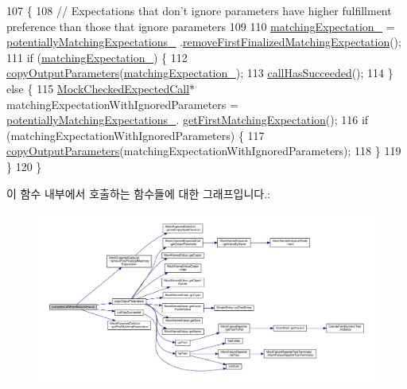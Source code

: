 \begin{DoxyCode}
107 \{
108     \textcolor{comment}{// Expectations that don't ignore parameters have higher fulfillment preference than those that ignore
       parameters}
109 
110     \hyperlink{class_mock_checked_actual_call_aca733859eb143b7a7bf611a39d94d6f6}{matchingExpectation\_} = \hyperlink{class_mock_checked_actual_call_a4fc6bec7509ed6eb28096956758c030a}{potentiallyMatchingExpectations\_}
      .\hyperlink{class_mock_expected_calls_list_a1a73fba9891c64207b06fb3f83fdad75}{removeFirstFinalizedMatchingExpectation}();
111     \textcolor{keywordflow}{if} (\hyperlink{class_mock_checked_actual_call_aca733859eb143b7a7bf611a39d94d6f6}{matchingExpectation\_}) \{
112         \hyperlink{class_mock_checked_actual_call_a36356ef39dd2664152f94d6843c45365}{copyOutputParameters}(\hyperlink{class_mock_checked_actual_call_aca733859eb143b7a7bf611a39d94d6f6}{matchingExpectation\_});
113         \hyperlink{class_mock_checked_actual_call_ae81fb048e3c671dcea98e758ce893af5}{callHasSucceeded}();
114     \} \textcolor{keywordflow}{else} \{
115         \hyperlink{class_mock_checked_expected_call}{MockCheckedExpectedCall}* matchingExpectationWithIgnoredParameters = 
      \hyperlink{class_mock_checked_actual_call_a4fc6bec7509ed6eb28096956758c030a}{potentiallyMatchingExpectations\_}.
      \hyperlink{class_mock_expected_calls_list_ab6c35f9ece49ce41eae2d46ed7b94a1d}{getFirstMatchingExpectation}();
116         \textcolor{keywordflow}{if} (matchingExpectationWithIgnoredParameters) \{
117             \hyperlink{class_mock_checked_actual_call_a36356ef39dd2664152f94d6843c45365}{copyOutputParameters}(matchingExpectationWithIgnoredParameters);
118         \}
119     \}
120 \}
\end{DoxyCode}


이 함수 내부에서 호출하는 함수들에 대한 그래프입니다.\+:
\nopagebreak
\begin{figure}[H]
\begin{center}
\leavevmode
\includegraphics[width=350pt]{class_mock_checked_actual_call_aae5ca9ab18e1a3a03ab292e825e2ece6_cgraph}
\end{center}
\end{figure}




